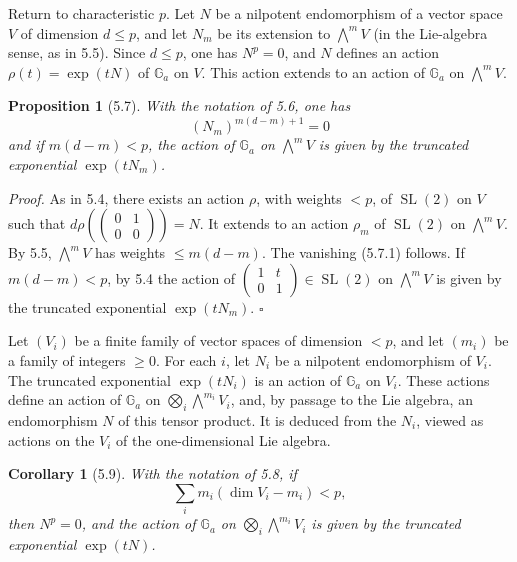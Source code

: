 \documentclass[10pt]{article}
\newcommand{\Ga}{\mathbb G_a}
\newcommand{\SL}{\operatorname{SL}}
\theoremstyle{deligne}
\newtheorem*{proposition*}{Proposition}
\newtheorem*{corollary*}{Corollary}
\newenvironment{proofdel}{\textit{Proof.}}{\hfill$\square$}
\newcommand{\heading}[1]{\vspace{0.7em}\noindent{\bfseries #1}\quad}
\begin{document}
\heading{5.6.}
Return to characteristic \(p\). Let \(N\) be a nilpotent endomorphism of a vector space \(V\) of dimension \(d\le p\), and let \(N_m\) be its extension to \(\bigwedge^m V\) (in the Lie-algebra sense, as in 5.5). Since \(d\le p\), one has \(N^p=0\), and \(N\) defines an action \(\rho(t)=\exp(tN)\) of \(\Ga\) on \(V\). This action extends to an action of \(\Ga\) on \(\bigwedge^m V\).

\begin{proposition*}[5.7]
With the notation of 5.6, one has
\[
\tag{5.7.1}
  (N_m)^{m(d-m)+1}=0
\]
and if \(m(d-m)<p\), the action of \(\Ga\) on \(\bigwedge^m V\) is given by the truncated exponential \(\exp(tN_m)\).
\end{proposition*}

\begin{proofdel}
As in 5.4, there exists an action \(\rho\), with weights \(<p\), of \(\SL(2)\) on \(V\) such that \(d\rho(\begin{pmatrix}0&1\\0&0\end{pmatrix})=N\). It extends to an action \(\rho_m\) of \(\SL(2)\) on \(\bigwedge^m V\). By 5.5, \(\bigwedge^m V\) has weights \(\le m(d-m)\). The vanishing (5.7.1) follows. If \(m(d-m)<p\), by 5.4 the action of \(\begin{pmatrix}1&t\\0&1\end{pmatrix}\in\SL(2)\) on \(\bigwedge^m V\) is given by the truncated exponential \(\exp(tN_m)\).
\end{proofdel}

\heading{5.8.}
Let \((V_i)\) be a finite family of vector spaces of dimension \(<p\), and let \((m_i)\) be a family of integers \(\ge0\). For each \(i\), let \(N_i\) be a nilpotent endomorphism of \(V_i\). The truncated exponential \(\exp(tN_i)\) is an action of \(\Ga\) on \(V_i\). These actions define an action of \(\Ga\) on \(\bigotimes_i\bigwedge^{m_i}V_i\), and, by passage to the Lie algebra, an endomorphism \(N\) of this tensor product. It is deduced from the \(N_i\), viewed as actions on the \(V_i\) of the one-dimensional Lie algebra.

\begin{corollary*}[5.9]
With the notation of 5.8, if
\[
\tag{5.9.1}
  \sum_i m_i(\dim V_i-m_i)<p,
\]
then \(N^p=0\), and the action of \(\Ga\) on \(\bigotimes_i\bigwedge^{m_i}V_i\) is given by the truncated exponential \(\exp(tN)\).
\end{corollary*}
\end{document}
